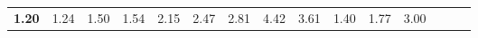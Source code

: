 \begin{tabular}{ll|rrrrrrrrr|rrrr}
  


  
  \textbf{1.20} & 1.24 & 1.50 & 1.54 & 2.15 & 2.47 & 2.81 & 4.42 & 3.61 & 1.40 & 1.77 & 3.00 &  \\


\end{tabular}
